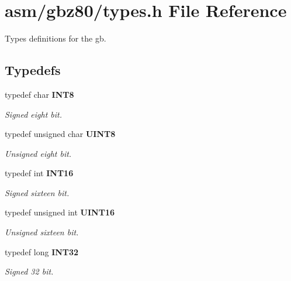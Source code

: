 \section{asm/gbz80/types.h File Reference}
\label{asm/gbz80/types.h}
Types definitions for the gb. 


\subsection*{Typedefs}
\begin{CompactItemize}
\item 
\label{asm/gbz80/types.h_a2}
typedef char {\bf INT8}
\begin{CompactList}\small\item\em Signed eight bit.\item\end{CompactList}

\item 
\label{asm/gbz80/types.h_a3}
typedef unsigned char {\bf UINT8}
\begin{CompactList}\small\item\em Unsigned eight bit.\item\end{CompactList}

\item 
\label{asm/gbz80/types.h_a4}
typedef int {\bf INT16}
\begin{CompactList}\small\item\em Signed sixteen bit.\item\end{CompactList}

\item 
\label{asm/gbz80/types.h_a5}
typedef unsigned int {\bf UINT16}
\begin{CompactList}\small\item\em Unsigned sixteen bit.\item\end{CompactList}

\item 
\label{asm/gbz80/types.h_a6}
typedef long {\bf INT32}
\begin{CompactList}\small\item\em Signed 32 bit.\item\end{CompactList}


\end{CompactItemize}
